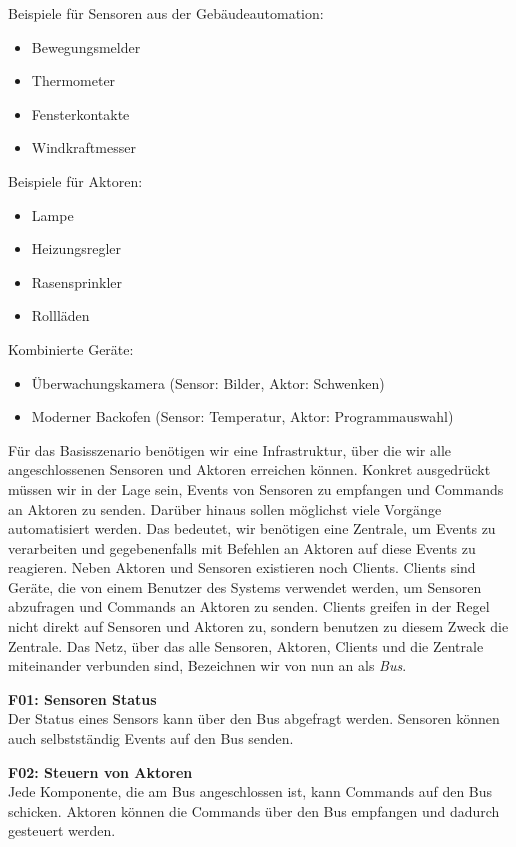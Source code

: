 Beispiele für Sensoren aus der Gebäudeautomation:

\begin{itemize}
	\item Bewegungsmelder
	\item Thermometer
	\item Fensterkontakte
	\item Windkraftmesser
\end{itemize}

Beispiele für Aktoren:

\begin{itemize}
	\item Lampe
	\item Heizungsregler
	\item Rasensprinkler
	\item Rollläden
\end{itemize}

Kombinierte Geräte:
\begin{itemize}
	\item Überwachungskamera (Sensor: Bilder, Aktor: Schwenken)
	\item Moderner Backofen (Sensor: Temperatur, Aktor: Programmauswahl)
\end{itemize}

Für das Basisszenario benötigen wir eine Infrastruktur, über die wir alle angeschlossenen Sensoren und Aktoren erreichen können. Konkret ausgedrückt müssen wir in der Lage sein, Events von Sensoren zu empfangen und Commands an Aktoren zu senden. Darüber hinaus sollen möglichst viele Vorgänge automatisiert werden. Das bedeutet, wir benötigen eine Zentrale, um Events zu verarbeiten und gegebenenfalls mit Befehlen an Aktoren auf diese Events zu reagieren. Neben Aktoren und Sensoren existieren noch Clients. Clients sind Geräte, die von einem Benutzer des Systems verwendet werden, um Sensoren abzufragen und Commands an Aktoren zu senden. Clients greifen in der Regel nicht direkt auf Sensoren und Aktoren zu, sondern benutzen zu diesem Zweck die Zentrale. Das Netz, über das alle Sensoren, Aktoren, Clients und die Zentrale miteinander verbunden sind, Bezeichnen wir von nun an als \textit{Bus}.

\textbf{F01: Sensoren Status} \\
Der Status eines Sensors kann über den Bus abgefragt werden. Sensoren können auch selbstständig Events auf den Bus senden.

\textbf{F02: Steuern von Aktoren} \\
Jede Komponente, die am Bus angeschlossen ist, kann Commands auf den Bus schicken. Aktoren können die Commands über den Bus empfangen und dadurch gesteuert werden. 

